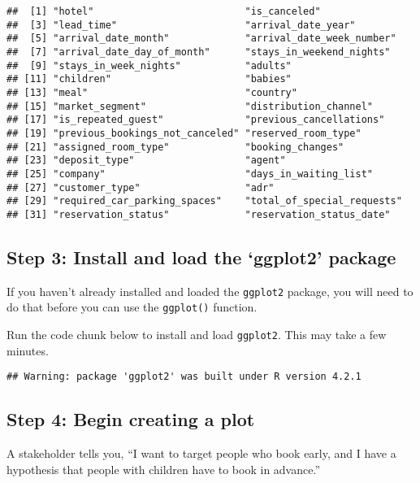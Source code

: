 \documentclass[
]{article}
\begin{document}
\begin{verbatim}
##  [1] "hotel"                          "is_canceled"                   
##  [3] "lead_time"                      "arrival_date_year"             
##  [5] "arrival_date_month"             "arrival_date_week_number"      
##  [7] "arrival_date_day_of_month"      "stays_in_weekend_nights"       
##  [9] "stays_in_week_nights"           "adults"                        
## [11] "children"                       "babies"                        
## [13] "meal"                           "country"                       
## [15] "market_segment"                 "distribution_channel"          
## [17] "is_repeated_guest"              "previous_cancellations"        
## [19] "previous_bookings_not_canceled" "reserved_room_type"            
## [21] "assigned_room_type"             "booking_changes"               
## [23] "deposit_type"                   "agent"                         
## [25] "company"                        "days_in_waiting_list"          
## [27] "customer_type"                  "adr"                           
## [29] "required_car_parking_spaces"    "total_of_special_requests"     
## [31] "reservation_status"             "reservation_status_date"
\end{verbatim}

\hypertarget{step-3-install-and-load-the-ggplot2-package}{%
\subsection{Step 3: Install and load the `ggplot2'
package}\label{step-3-install-and-load-the-ggplot2-package}}

If you haven't already installed and loaded the \texttt{ggplot2}
package, you will need to do that before you can use the
\texttt{ggplot()} function.

Run the code chunk below to install and load \texttt{ggplot2}. This may
take a few minutes.

\begin{verbatim}
## Warning: package 'ggplot2' was built under R version 4.2.1
\end{verbatim}

\hypertarget{step-4-begin-creating-a-plot}{%
\subsection{Step 4: Begin creating a
plot}\label{step-4-begin-creating-a-plot}}

A stakeholder tells you, ``I want to target people who book early, and I
have a hypothesis that people with children have to book in advance.''
\end{document}
